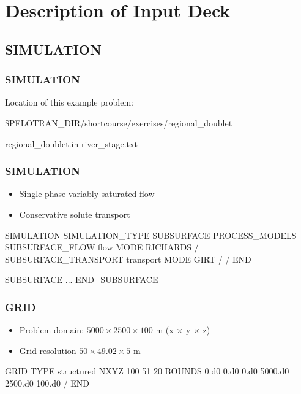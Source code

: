 \documentclass{beamer}
\begin{document}
\section{Description of Input Deck}

\subsection{SIMULATION}

\begin{frame}\frametitle{SIMULATION}

Location of this example problem:

\begin{semiverbatim}
\$PFLOTRAN_DIR/shortcourse/exercises/regional_doublet

regional_doublet.in
river_stage.txt
\end{semiverbatim}

\end{frame}

\begin{frame}\frametitle{SIMULATION}

\begin{itemize}
  \item Single-phase variably saturated flow
  \item Conservative solute transport
\end{itemize}

\begin{semiverbatim}
SIMULATION
  SIMULATION_TYPE SUBSURFACE
  PROCESS_MODELS
    SUBSURFACE_FLOW flow
      MODE RICHARDS
    /
    SUBSURFACE_TRANSPORT transport
      MODE GIRT
    /
  /
END

SUBSURFACE
  ...
END_SUBSURFACE
\end{semiverbatim}

\end{frame}

\begin{frame}\frametitle{GRID}

\begin{itemize}
  \item Problem domain: $5000 \times 2500 \times 100$ m (x $\times$ y $\times$ z)
  \item Grid resolution $50 \times 49.02 \times 5$ m
\end{itemize}

\begin{semiverbatim}
GRID
  TYPE structured
  NXYZ 100 51 20
  BOUNDS
    0.d0 0.d0 0.d0
    5000.d0 2500.d0 100.d0
  /
END
\end{semiverbatim}

\end{frame}
\end{document}
